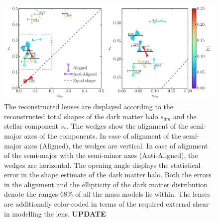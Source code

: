 \documentclass[useAMS,usenatbib]{mn2e}
\begin{document}
\begin{figure}
  \centering
  \includegraphics[width=.75\linewidth]{Figures/wedges_shears.pdf}
  \caption[width=\linewidth]{The reconstructed lenses are displayed according to the reconstructed total shapes of the dark matter halo $s_{dm}$ and the stellar component $s_{*}$. The wedges show the alignment of the semi-major axes of the components. In case of alignment of the semi-major axes (Aligned), the wedges are vertical. In case of alignment of the semi-major with the semi-minor axes (Anti-Aligned), the wedges are horizontal. The opening angle displays the statistical error in the shape estimate of the dark matter halo. Both the errors in the alignment and the ellipticity of the dark matter distribution denote the ranges $68\%$ of all the mass models lie within. The lenses are additionally color-coded in terms of the required external shear in modelling the lens. \textbf{UPDATE}}
  \label{fig:wedgesall}
\end{figure}
\end{document}
